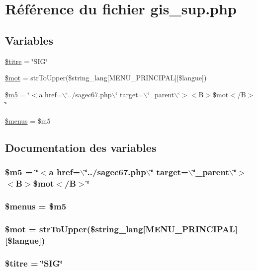 \hypertarget{gis__sup_8php}{
\section{R\'{e}f\'{e}rence du fichier gis\_\-sup.php}
\label{gis__sup_8php}
}
\subsection*{Variables}
\begin{CompactItemize}
\item 
\hyperlink{gis__sup_8php_a0}{\$titre} = \char`\"{}SIG\char`\"{}
\item 
\hyperlink{gis__sup_8php_a1}{\$mot} = str\-To\-Upper(\$string\_\-lang\mbox{[}MENU\_\-PRINCIPAL\mbox{]}\mbox{[}\$langue\mbox{]})
\item 
\hyperlink{gis__sup_8php_a2}{\$m5} = \char`\"{}$<$a href=$\backslash$\char`\"{}../sagec67.php$\backslash$\char`\"{} target=$\backslash$\char`\"{}\_\-parent$\backslash$\char`\"{}$>$$<$B$>$\$mot$<$/B$>$\char`\"{}
\item 
\hyperlink{gis__sup_8php_a3}{\$menus} = \$m5
\end{CompactItemize}


\subsection{Documentation des variables}
\hypertarget{gis__sup_8php_a2}{
\subsubsection[\$m5]{\setlength{\rightskip}{0pt plus 5cm}\$m5 = \char`\"{}$<$a href=$\backslash$\char`\"{}../sagec67.php$\backslash$\char`\"{} target=$\backslash$\char`\"{}\_\-parent$\backslash$\char`\"{}$>$$<$B$>$\$mot$<$/B$>$\char`\"{}}}
\label{gis__sup_8php_a2}


\hypertarget{gis__sup_8php_a3}{
\subsubsection[\$menus]{\setlength{\rightskip}{0pt plus 5cm}\$menus = \$m5}}
\label{gis__sup_8php_a3}


\hypertarget{gis__sup_8php_a1}{
\subsubsection[\$mot]{\setlength{\rightskip}{0pt plus 5cm}\$mot = str\-To\-Upper(\$string\_\-lang\mbox{[}MENU\_\-PRINCIPAL\mbox{]}\mbox{[}\$langue\mbox{]})}}
\label{gis__sup_8php_a1}


\hypertarget{gis__sup_8php_a0}{
\subsubsection[\$titre]{\setlength{\rightskip}{0pt plus 5cm}\$titre = \char`\"{}SIG\char`\"{}}}
\label{gis__sup_8php_a0}


